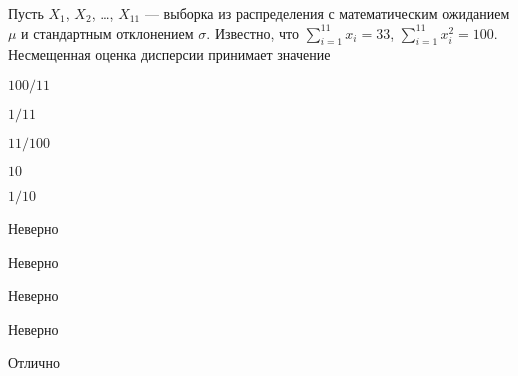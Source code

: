 
\begin{question}
Пусть \(X_1\), \(X_2\), \ldots, \(X_{11}\) --- выборка из распределения
с математическим ожиданием \(\mu\) и стандартным отклонением \(\sigma\).
Известно, что \(\sum_{i=1}^{11}x_i=33\), \(\sum_{i=1}^{11}x_i^2=100\).
Несмещенная оценка дисперсии принимает значение
\begin{answerlist}
  \item \(100/11\)
  \item \(1/11\)
  \item \(11/100\)
  \item \(10\)
  \item \(1/10\)
\end{answerlist}
\end{question}

\begin{solution}
\begin{answerlist}
  \item Неверно
  \item Неверно
  \item Неверно
  \item Неверно
  \item Отлично
\end{answerlist}
\end{solution}

